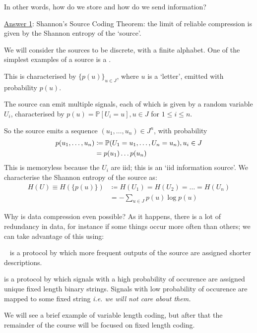 \documentclass[]{article}
\begin{document}
In other words, how do we store and how do we send information?

\underline{Answer 1}: Shannon's Source Coding Theorem: the limit of reliable compression is given by the Shannon entropy of the `source'.

We will consider the sources to be discrete, with a finite alphabet. One of the simplest examples of a source is a .

\begin{defin*}
    This is characterised by $\{p(u)\}_{u\in J}$, where $u$ is a `letter', emitted with probability $p(u)$.

    The source can emit multiple signals, each of which is given by a random variable $U_i$, characterised by $p(u) = \mathbb{P}[U_i=u],u\in J$ for $1\le i\le n$.

    So the source emits a sequence $(u_1,\dots,u_n)\in J^n$, with probability
    \begin{align*}
        p(u_1,\dots,u_n)&\coloneqq \P(U_1=u_1,\dots,U_n = u_n),u_i\in J \\
        &= p(u_1)\dots p(u_n)
    \end{align*}
    This is memoryless because the $U_i$ are iid; this is an `iid information source'. We characterise the Shannon entropy of the source as:
    \begin{align*}
        H(U) \equiv H(\{p(u)\})&\coloneqq H(U_1) = H(U_2) = \dots = H(U_n)\\
        &= -\sum_{u\in J}p(u)\log p(u)
    \end{align*}
\end{defin*}

Why is data compression even possible? As it happens, there is a lot of redundancy in data, for instance if some things occur more often than others; we can take advantage of this using:

\begin{defin*}\ 
     is a protocol by which more frequent outputs of the source are assigned shorter descriptions.

     is a protocol by which signals with a high probability of occurence are assigned unique fixed length binary strings. Signals with low probability of occurence are mapped to some fixed string \it{i.e.} we will not care about them.
\end{defin*}

We will see a brief example of variable length coding, but after that the remainder of the course will be focused on fixed length coding.
\end{document}
